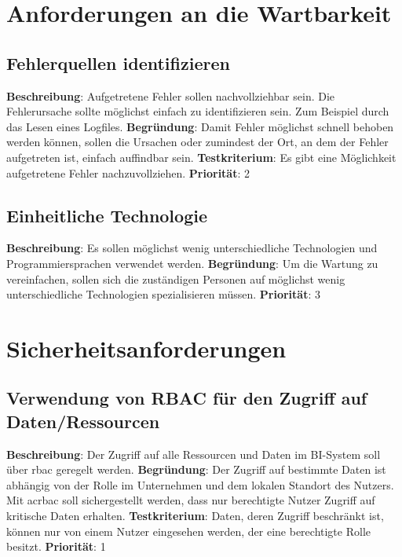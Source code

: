 \section{Anforderungen an die Wartbarkeit} \label{sec:anforderungsspezifikation:wartbarkeit}

\subsection{Fehlerquellen identifizieren} \label{sec:anforderungsspezifikation:fehlerquellenIdentifizieren}
\textbf{Beschreibung}: Aufgetretene Fehler sollen nachvollziehbar sein. Die Fehlerursache sollte möglichst einfach zu identifizieren sein. Zum Beispiel durch das Lesen eines Logfiles.
\newline \textbf{Begründung}: Damit Fehler möglichst schnell behoben werden können, sollen die Ursachen oder zumindest der Ort, an dem der Fehler aufgetreten ist, einfach auffindbar sein.
\newline \textbf{Testkriterium}: Es gibt eine Möglichkeit aufgetretene Fehler nachzuvollziehen.
\newline \textbf{Priorität}: 2

\subsection{Einheitliche Technologie} \label{sec:anforderungsspezifikation:einheitlicheTechnologie}
\textbf{Beschreibung}: Es sollen möglichst wenig unterschiedliche Technologien und Programmiersprachen verwendet werden.
\newline \textbf{Begründung}: Um die Wartung zu vereinfachen, sollen sich die zuständigen Personen auf möglichst wenig unterschiedliche Technologien spezialisieren müssen.
\newline \textbf{Priorität}: 3

\section{Sicherheitsanforderungen} \label{sec:anforderungsspezifikation:sicherheitsanforderungen}

\subsection{Verwendung von RBAC für den Zugriff auf Daten/Ressourcen} \label{sec:anforderungsspezifikation:rbac}
\textbf{Beschreibung}: Der Zugriff auf alle Ressourcen und Daten im BI-System soll über \ac{rbac} geregelt werden.
\newline \textbf{Begründung}: Der Zugriff auf bestimmte Daten ist abhängig von der Rolle im Unternehmen und dem lokalen Standort des Nutzers. Mit ac{rbac} soll sichergestellt werden, dass nur berechtigte Nutzer Zugriff auf kritische Daten erhalten.
\newline \textbf{Testkriterium}: Daten, deren Zugriff beschränkt ist, können nur von einem Nutzer eingesehen werden, der eine berechtigte Rolle besitzt.
\newline \textbf{Priorität}: 1

